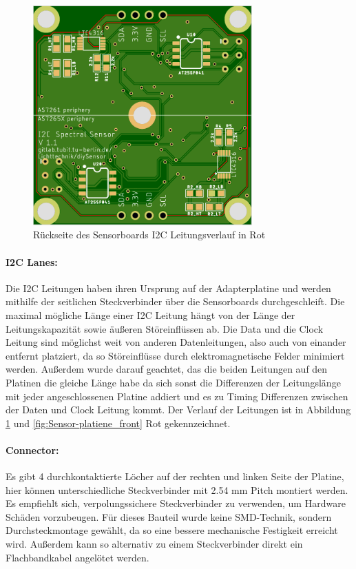 \begin{figure}[H]
\centering
\includegraphics[width=0.75\textwidth]{img/Sensor-platiene_back}
\caption{Rückseite des Sensorboards I2C Leitungsverlauf in Rot}
\label{fig:Sensor-platiene_back}
\end{figure}

\paragraph{I2C Lanes:}
Die I2C Leitungen haben ihren Ursprung auf der Adapterplatine und werden mithilfe der seitlichen Steckverbinder über die Sensorboards durchgeschleift.
Die maximal mögliche Länge einer I2C Leitung hängt von der Länge der Leitungskapazität sowie äußeren Störeinflüssen ab.
Die Data und die Clock Leitung sind möglichst weit von anderen Datenleitungen, also auch von einander entfernt platziert, da so Störeinflüsse durch elektromagnetische Felder minimiert werden.
Außerdem wurde darauf geachtet, das die beiden Leitungen auf den Platinen die gleiche Länge habe da sich sonst die Differenzen der Leitungslänge mit jeder angeschlossenen Platine addiert und es zu Timing Differenzen zwischen der Daten und Clock Leitung kommt.
Der Verlauf der Leitungen ist in Abbildung \ref{fig:Sensor-platiene_back} und \ref{fig:Sensor-platiene_front} Rot gekennzeichnet.

\paragraph{Connector:} Es gibt 4 durchkontaktierte Löcher auf der rechten und linken Seite der Platine, hier können unterschiedliche Steckverbinder mit 2.54 mm Pitch montiert werden.
	Es empfiehlt sich, verpolungssichere Steckverbinder zu verwenden, um Hardware Schäden vorzubeugen.
	Für dieses Bauteil wurde keine SMD-Technik, sondern Durchsteckmontage gewählt, da so eine bessere mechanische Festigkeit erreicht wird.
	Außerdem kann so alternativ zu einem Steckverbinder direkt ein Flachbandkabel angelötet werden.


